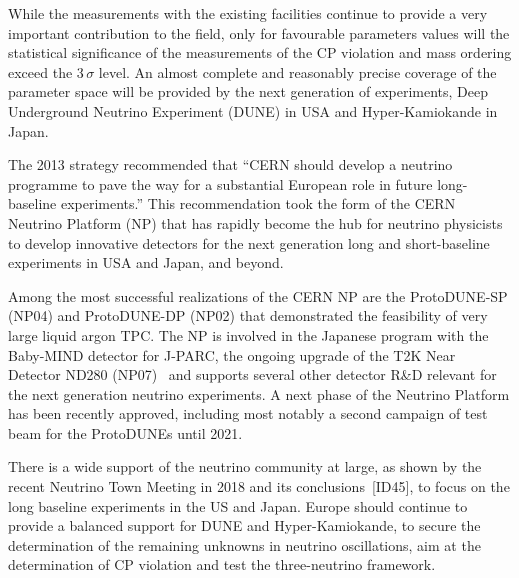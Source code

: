 While the measurements with the existing facilities continue to provide a very important contribution to the field, only for favourable parameters values will the statistical significance of the measurements of the CP violation and mass ordering exceed the 3\,$\sigma$ level. An almost complete and reasonably precise coverage of the parameter space will be provided by the next generation of experiments, Deep Underground Neutrino Experiment (DUNE) in USA and Hyper-Kamiokande in Japan. 

The 2013 strategy recommended that ``CERN should develop a neutrino programme to pave the way for a substantial European role in future long-baseline
experiments.'' This recommendation took the form of the CERN Neutrino Platform (NP) that has rapidly become the hub for neutrino physicists to develop innovative detectors for the next generation long and short-baseline experiments in USA and Japan, and beyond.

Among the most successful realizations of the CERN NP are the ProtoDUNE-SP (NP04) and ProtoDUNE-DP (NP02) that demonstrated the feasibility of very large liquid argon TPC. The NP is involved in the Japanese program with the Baby-MIND detector for J-PARC, the ongoing upgrade of the T2K Near Detector ND280 (NP07)~\cite{Abe:2019whr} and supports several other detector R\&D relevant for the next generation neutrino experiments.
A next phase of the Neutrino Platform has been recently approved, including most notably a second campaign of test beam for the ProtoDUNEs until 2021.

There is a wide support of the neutrino community at large, as shown by the recent Neutrino Town Meeting in 2018 and its conclusions~[ID45],    %
to focus on the long baseline experiments in the US and Japan. Europe should
continue to provide a balanced support for DUNE and Hyper-Kamiokande, to secure the determination of the remaining unknowns in neutrino oscillations, aim at the determination of CP violation and test the three-neutrino framework. 

